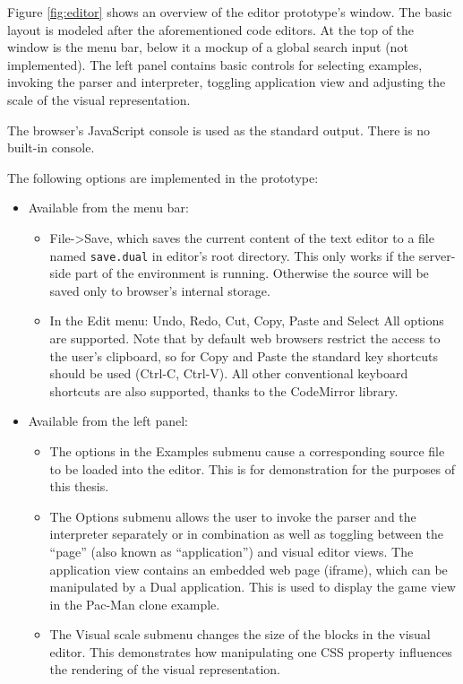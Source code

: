 Figure \ref{fig:editor} shows an overview of the editor prototype's window. The
basic layout is modeled after the aforementioned code editors. At the top of the
window is the menu bar, below it a mockup of a global search input (not implemented). The left panel contains basic controls for selecting examples,
invoking the parser and interpreter, toggling application view and adjusting the
scale of the visual representation.

The browser's JavaScript console is used as the standard output. There is no built-in console.

The following options are implemented in the prototype:
\begin{itemize}
    \item Available from the menu bar:
    \begin{itemize}
        \item File->Save, which saves the current content of the text editor to
          a file named \texttt{save.dual} in editor's root directory. This only
          works if the server-side part of the environment is running. Otherwise
          the source will be saved only to browser's internal storage.
        \item In the Edit menu: Undo, Redo, Cut, Copy, Paste and Select All
          options are supported. Note that by default web browsers restrict the
          access to the user's clipboard, so for Copy and Paste the standard key
          shortcuts should be used (Ctrl-C, Ctrl-V). All other conventional
          keyboard shortcuts are also supported, thanks to the CodeMirror
          library.
    \end{itemize}
    \item Available from the left panel:
    \begin{itemize}
        \item The options in the Examples submenu cause a corresponding source
          file to be loaded into the editor. This is for demonstration for the
          purposes of this thesis.
        \item The Options submenu allows the user to invoke the parser and the
          interpreter separately or in combination as well as toggling between
          the ``page'' (also known as ``application'') and visual editor
          views. The application view contains an embedded web page (iframe),
          which can be manipulated by a Dual application. This is used to
          display the game view in the Pac-Man clone example.
        \item The Visual scale submenu changes the size of the blocks in the
          visual editor. This demonstrates how manipulating one CSS property
          influences the rendering of the visual representation.
    \end{itemize}
\end{itemize}

